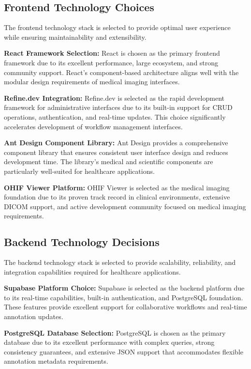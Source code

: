 \subsection{Frontend Technology Choices}

The frontend technology stack is selected to provide optimal user experience while ensuring maintainability and extensibility.

\textbf{React Framework Selection:} React is chosen as the primary frontend framework due to its excellent performance, large ecosystem, and strong community support. React's component-based architecture aligns well with the modular design requirements of medical imaging interfaces.

\textbf{Refine.dev Integration:} Refine.dev is selected as the rapid development framework for administrative interfaces due to its built-in support for CRUD operations, authentication, and real-time updates. This choice significantly accelerates development of workflow management interfaces.

\textbf{Ant Design Component Library:} Ant Design provides a comprehensive component library that ensures consistent user interface design and reduces development time. The library's medical and scientific components are particularly well-suited for healthcare applications.

\textbf{OHIF Viewer Platform:} OHIF Viewer is selected as the medical imaging foundation due to its proven track record in clinical environments, extensive DICOM support, and active development community focused on medical imaging requirements.

\subsection{Backend Technology Decisions}

The backend technology stack is selected to provide scalability, reliability, and integration capabilities required for healthcare applications.

\textbf{Supabase Platform Choice:} Supabase is selected as the backend platform due to its real-time capabilities, built-in authentication, and PostgreSQL foundation. These features provide excellent support for collaborative workflows and real-time annotation updates.

\textbf{PostgreSQL Database Selection:} PostgreSQL is chosen as the primary database due to its excellent performance with complex queries, strong consistency guarantees, and extensive JSON support that accommodates flexible annotation metadata requirements.

